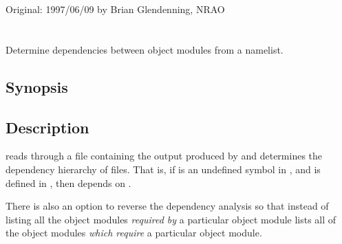 Original: 1997/06/09 by Brian Glendenning, NRAO


\newpage
\section{}
\label{ldmap}

Determine dependencies between object modules from a namelist.

\subsection*{Synopsis}

\begin{synopsis}
\end{synopsis}

\subsection*{Description}

 reads through a file containing the output produced by
 and determines the dependency hierarchy of  files.  That
is, if  is an undefined symbol in , and  is defined
in , then  depends on .

There is also an option to reverse the dependency analysis so that instead of
listing all the object modules {\em required by} a particular object module
 lists all of the object modules {\em which require} a particular
object module.

